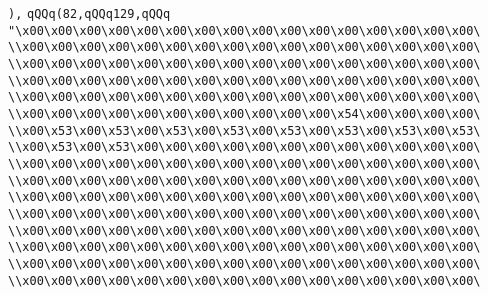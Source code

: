\verb|),|\newline
\verb|qQQq(82,qQQq129,qQQq|\newline
\verb|"\x00\x00\x00\x00\x00\x00\x00\x00\x00\x00\x00\x00\x00\x00\x00\x00\|\newline
\verb|\\x00\x00\x00\x00\x00\x00\x00\x00\x00\x00\x00\x00\x00\x00\x00\x00\|\newline
\verb|\\x00\x00\x00\x00\x00\x00\x00\x00\x00\x00\x00\x00\x00\x00\x00\x00\|\newline
\verb|\\x00\x00\x00\x00\x00\x00\x00\x00\x00\x00\x00\x00\x00\x00\x00\x00\|\newline
\verb|\\x00\x00\x00\x00\x00\x00\x00\x00\x00\x00\x00\x00\x00\x00\x00\x00\|\newline
\verb|\\x00\x00\x00\x00\x00\x00\x00\x00\x00\x00\x00\x54\x00\x00\x00\x00\|\newline
\verb|\\x00\x53\x00\x53\x00\x53\x00\x53\x00\x53\x00\x53\x00\x53\x00\x53\|\newline
\verb|\\x00\x53\x00\x53\x00\x00\x00\x00\x00\x00\x00\x00\x00\x00\x00\x00\|\newline
\verb|\\x00\x00\x00\x00\x00\x00\x00\x00\x00\x00\x00\x00\x00\x00\x00\x00\|\newline
\verb|\\x00\x00\x00\x00\x00\x00\x00\x00\x00\x00\x00\x00\x00\x00\x00\x00\|\newline
\verb|\\x00\x00\x00\x00\x00\x00\x00\x00\x00\x00\x00\x00\x00\x00\x00\x00\|\newline
\verb|\\x00\x00\x00\x00\x00\x00\x00\x00\x00\x00\x00\x00\x00\x00\x00\x00\|\newline
\verb|\\x00\x00\x00\x00\x00\x00\x00\x00\x00\x00\x00\x00\x00\x00\x00\x00\|\newline
\verb|\\x00\x00\x00\x00\x00\x00\x00\x00\x00\x00\x00\x00\x00\x00\x00\x00\|\newline
\verb|\\x00\x00\x00\x00\x00\x00\x00\x00\x00\x00\x00\x00\x00\x00\x00\x00\|\newline
\verb|\\x00\x00\x00\x00\x00\x00\x00\x00\x00\x00\x00\x00\x00\x00\x00\x00\|\newline
